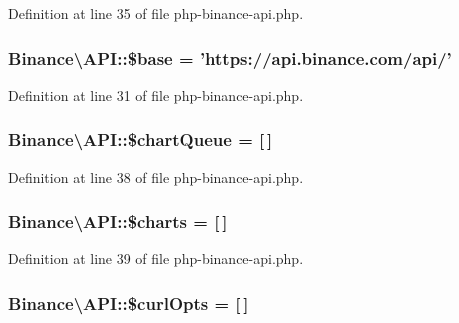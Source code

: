 Definition at line 35 of file php-\/binance-\/api.\-php.

\hypertarget{classBinance_1_1API_ac863e52396757997d84e6783b5336828}{
\subsubsection[{\$base}]{\setlength{\rightskip}{0pt plus 5cm}Binance\textbackslash{}\-A\-P\-I\-::\$base = 'https\-://api.\-binance.\-com/api/'\hspace{0.3cm}{\ttfamily [protected]}}}\label{classBinance_1_1API_ac863e52396757997d84e6783b5336828}


Definition at line 31 of file php-\/binance-\/api.\-php.

\hypertarget{classBinance_1_1API_aaa75d873054290eecf1dd2876237a279}{
\subsubsection[{\$chart\-Queue}]{\setlength{\rightskip}{0pt plus 5cm}Binance\textbackslash{}\-A\-P\-I\-::\$chart\-Queue = \mbox{[}$\,$\mbox{]}\hspace{0.3cm}{\ttfamily [protected]}}}\label{classBinance_1_1API_aaa75d873054290eecf1dd2876237a279}


Definition at line 38 of file php-\/binance-\/api.\-php.

\hypertarget{classBinance_1_1API_a0c2d0cd199527b3b275143c49d91702e}{
\subsubsection[{\$charts}]{\setlength{\rightskip}{0pt plus 5cm}Binance\textbackslash{}\-A\-P\-I\-::\$charts = \mbox{[}$\,$\mbox{]}\hspace{0.3cm}{\ttfamily [protected]}}}\label{classBinance_1_1API_a0c2d0cd199527b3b275143c49d91702e}


Definition at line 39 of file php-\/binance-\/api.\-php.

\hypertarget{classBinance_1_1API_ace9645947686e99baf916e3bc189aeaf}{
\subsubsection[{\$curl\-Opts}]{\setlength{\rightskip}{0pt plus 5cm}Binance\textbackslash{}\-A\-P\-I\-::\$curl\-Opts = \mbox{[}$\,$\mbox{]}\hspace{0.3cm}{\ttfamily [protected]}}}\label{classBinance_1_1API_ace9645947686e99baf916e3bc189aeaf}


